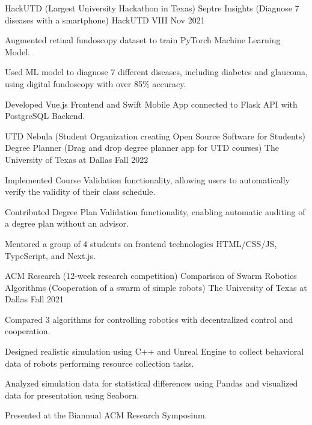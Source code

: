 
\begin{cventries}

\cventry
{HackUTD \color{lightgray} (Largest University Hackathon in Texas)}
{Septre Insights \color{gray} (Diagnose 7 diseases with a smartphone)}
{HackUTD VIII}
{Nov 2021}
{
\begin{cvitems}
\item {Augmented retinal fundoscopy dataset to train PyTorch Machine Learning
	Model.}
\item {Used ML model to diagnose 7 different diseases, including diabetes and
	glaucoma, using digital fundoscopy with over 85\% accuracy.}
\item {Developed Vue.js Frontend and Swift Mobile App connected to Flask API with PostgreSQL Backend.}
\end{cvitems}
}

\cventry
{UTD Nebula \color{lightgray} (Student Organization creating Open Source Software for Students)}
{Degree Planner \color{gray} (Drag and drop degree planner app for UTD courses)}
{The University of Texas at Dallas}
{Fall 2022}
{
\begin{cvitems}
\item {Implemented Course Validation functionality, allowing users to
	automatically verify the validity of their class schedule.}
\item {Contributed Degree Plan Validation functionality, enabling automatic auditing of a degree plan without an advisor.}
\item {Mentored a group of 4 students on frontend technologies HTML/CSS/JS,
	TypeScript, and Next.js.}
\end{cvitems}
}

\cventry
{ACM Research \color{lightgray}(12-week research competition)}
{Comparison of Swarm Robotics Algorithms \color{gray} (Cooperation of a swarm
	of simple robots)}
{The University of Texas at Dallas}
{Fall 2021}
{
\begin{cvitems}
\item {Compared 3 algorithms for controlling robotics with decentralized control
	and cooperation.}
\item {Designed realistic simulation using C++ and Unreal Engine to collect
	behavioral data of robots performing resource collection tasks.}
\item {Analyzed simulation data for statistical differences using Pandas and
	visualized data for presentation using Seaborn.}
\item {Presented at the Biannual ACM Research Symposium.}
\end{cvitems}
}

\end{cventries}
